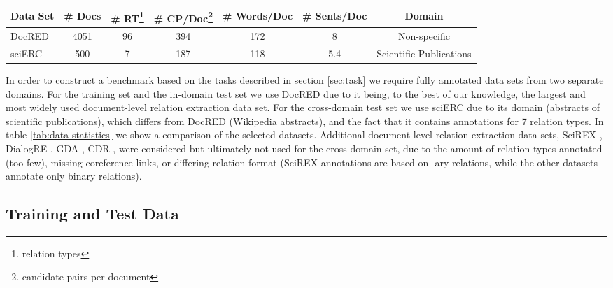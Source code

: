 \documentclass[11pt]{article}
\begin{document}
\begin{table*}
\centering
\renewcommand\thempfootnote{\arabic{mpfootnote}}
\begin{minipage}{\textwidth} 

\begin{tabular}{lcccccc}
\hline
\textbf{Data Set} & \textbf{\# Docs} & \textbf{\# RT\footnote{relation types}} & \textbf{\# CP/Doc\footnote{candidate pairs per document}} & \textbf{\# Words/Doc} & \textbf{\# Sents/Doc} & \textbf{Domain}\\
\hline
DocRED & 4051 & 96 & 394 & 172 & 8 & Non-specific\\
sciERC & 500 & 7 & 187 & 118 & 5.4 & Scientific Publications\\
\hline
\end{tabular}
\end{minipage}
\caption{\label{tab:data-statistics} A comparison of DocRED \cite{yao_docred_2019} and sciERC \cite{luan_multi-task_2018}, the datasets selected for the FREDo benchmark.}
\end{table*}



In order to construct a benchmark based on the tasks described in section \ref{sec:task} we require fully annotated data sets from two separate domains.
For the training set and the in-domain test set we use Doc\-RED \cite{yao_docred_2019} due to it being, to the best of our knowledge, the largest and most widely used document-level relation extraction data set. 
For the cross-domain test set we use sciERC \cite{luan_multi-task_2018} due to its domain (abstracts of scientific publications), which differs from DocRED (Wikipedia abstracts), and the fact that it contains annotations for 7 relation types. In table \ref{tab:data-statistics} we show a comparison of the selected datasets.
Additional document-level relation extraction data sets, SciREX \cite{jain-etal-2020-scirex}, DialogRE \cite{yu2020dialogue}, GDA \cite{wu_renet_2019}, CDR \cite{li_biocreative_2016}, were considered but ultimately not used for the cross-domain set, due to the amount of relation types annotated (too few), missing coreference links, or differing relation format (SciREX annotations are based on -ary relations, while the other datasets annotate only binary relations).

\subsection{Training and Test Data}
\end{document}
